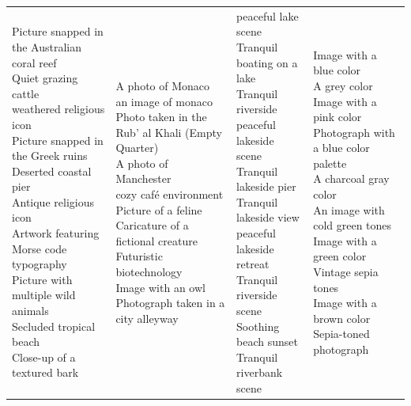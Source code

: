 \documentclass{article}
\begin{document}
\begin{table}[htbp]
\begin{tabular}{|p{4.0cm}|p{4.0cm}|p{4.0cm}|p{4.0cm}|}
\hline
\makecell[t]{Picture snapped in the Australian coral reef \\ Quiet grazing cattle \\ weathered religious icon \\ Picture snapped in the Greek ruins \\ Deserted coastal pier \\ Antique religious icon \\ Artwork featuring Morse code typography \\ Picture with multiple wild animals \\ Secluded tropical beach \\ Close-up of a textured bark} & \makecell[t]{A photo of Monaco \\ an image of monaco \\ Photo taken in the Rub' al Khali (Empty Quarter) \\ A photo of Manchester \\ cozy café environment \\ Picture of a feline \\ Caricature of a fictional creature \\ Futuristic biotechnology \\ Image with an owl \\ Photograph taken in a city alleyway} & \makecell[t]{peaceful lake scene \\ Tranquil boating on a lake \\ Tranquil riverside \\ peaceful lakeside scene \\ Tranquil lakeside pier \\ Tranquil lakeside view \\ peaceful lakeside retreat \\ Tranquil riverside scene \\ Soothing beach sunset \\ Tranquil riverbank scene} & \makecell[t]{Image with a blue color \\ A grey color \\ Image with a pink color \\ Photograph with a blue color palette \\ A charcoal gray color \\ An image with cold green tones \\ Image with a green color \\ Vintage sepia tones \\ Image with a brown color \\ Sepia-toned photograph} \\

\end{tabular}
\end{table}
\end{document}
